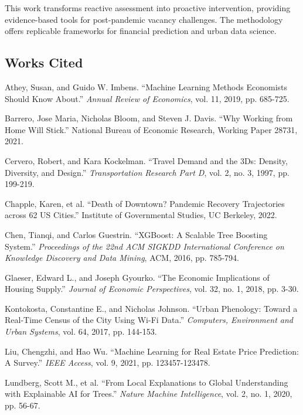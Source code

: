 \documentclass[12pt,letterpaper]{article}
\begin{document}
This work transforms reactive assessment into proactive intervention, providing evidence-based tools for post-pandemic vacancy challenges. The methodology offers replicable frameworks for financial prediction and urban data science.

\begin{singlespace}
\section*{Works Cited}

\hangindent=0.5in Athey, Susan, and Guido W. Imbens. ``Machine Learning Methods Economists Should Know About.'' \textit{Annual Review of Economics}, vol. 11, 2019, pp. 685-725.

\hangindent=0.5in Barrero, Jose Maria, Nicholas Bloom, and Steven J. Davis. ``Why Working from Home Will Stick.'' National Bureau of Economic Research, Working Paper 28731, 2021.

\hangindent=0.5in Cervero, Robert, and Kara Kockelman. ``Travel Demand and the 3Ds: Density, Diversity, and Design.'' \textit{Transportation Research Part D}, vol. 2, no. 3, 1997, pp. 199-219.

\hangindent=0.5in Chapple, Karen, et al. ``Death of Downtown? Pandemic Recovery Trajectories across 62 US Cities.'' Institute of Governmental Studies, UC Berkeley, 2022.

\hangindent=0.5in Chen, Tianqi, and Carlos Guestrin. ``XGBoost: A Scalable Tree Boosting System.'' \textit{Proceedings of the 22nd ACM SIGKDD International Conference on Knowledge Discovery and Data Mining}, ACM, 2016, pp. 785-794.

\hangindent=0.5in Glaeser, Edward L., and Joseph Gyourko. ``The Economic Implications of Housing Supply.'' \textit{Journal of Economic Perspectives}, vol. 32, no. 1, 2018, pp. 3-30.

\hangindent=0.5in Kontokosta, Constantine E., and Nicholas Johnson. ``Urban Phenology: Toward a Real-Time Census of the City Using Wi-Fi Data.'' \textit{Computers, Environment and Urban Systems}, vol. 64, 2017, pp. 144-153.

\hangindent=0.5in Liu, Chengzhi, and Hao Wu. ``Machine Learning for Real Estate Price Prediction: A Survey.'' \textit{IEEE Access}, vol. 9, 2021, pp. 123457-123478.

\hangindent=0.5in Lundberg, Scott M., et al. ``From Local Explanations to Global Understanding with Explainable AI for Trees.'' \textit{Nature Machine Intelligence}, vol. 2, no. 1, 2020, pp. 56-67.


\end{singlespace}
\end{document}
